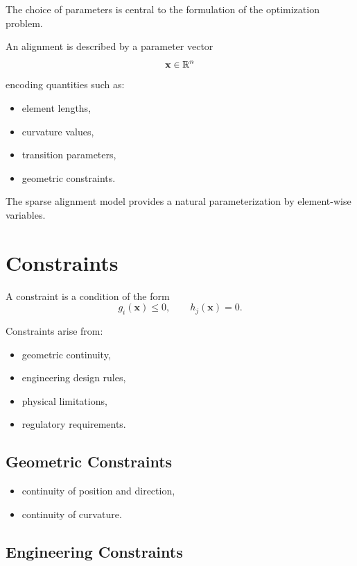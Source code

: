 The choice of parameters is central to the formulation of the
optimization problem.

\begin{definition}
An alignment is described by a parameter vector
\[
\mathbf{x} \in \mathbb{R}^n
\]
encoding quantities such as:
\begin{itemize}
\item element lengths,
\item curvature values,
\item transition parameters,
\item geometric constraints.
\end{itemize}
\end{definition}

The sparse alignment model provides a natural parameterization by
element-wise variables.


\section{Constraints}

\begin{definition}[Constraint]
A constraint is a condition of the form
\[
g_i(\mathbf{x}) \leq 0,
\qquad
h_j(\mathbf{x}) = 0.
\]
\end{definition}

Constraints arise from:
\begin{itemize}
\item geometric continuity,
\item engineering design rules,
\item physical limitations,
\item regulatory requirements.
\end{itemize}

\subsection{Geometric Constraints}

\begin{itemize}
\item continuity of position and direction,
\item continuity of curvature.
\end{itemize}

\subsection{Engineering Constraints}

